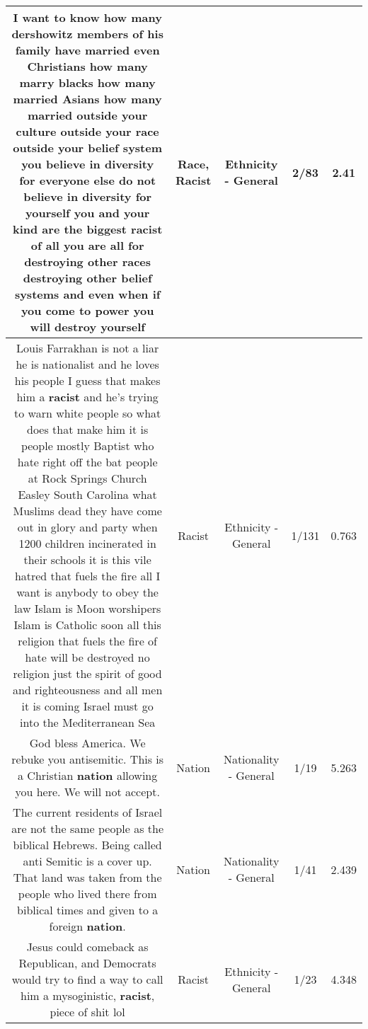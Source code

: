 \documentclass[11pt]{article}
\newlength\mylength
\begin{document}
\begin{center}
\begin{longtable}{|C{.65\mylength}|C{.30\mylength}|C{.12\mylength}|C{.12\mylength}|C{.12\mylength}|}
  \small I want to know how many dershowitz members of his family have married even Christians how many marry blacks how many married Asians how many married outside your culture outside your \textbf{race} outside your belief system you believe in diversity for everyone else do not believe in diversity for yourself you and your kind are the biggest \textbf{racist} of all you are all for destroying other races destroying other belief systems and even when if you come to power you will destroy yourself\normalsize   & Race, Racist & Ethnicity - General & 2/83 & 2.41 \\  \hline
  \small Louis Farrakhan is not a liar he is nationalist and he loves his people I guess that makes him a \textbf{racist} and he's trying to warn white people so what does that make him it is people mostly Baptist who hate right off the bat people at Rock Springs Church Easley South Carolina what Muslims dead they have come out in glory and party when 1200 children incinerated in their schools it is this vile hatred that fuels the fire all I want is anybody to obey the law Islam is Moon worshipers Islam is Catholic soon all this religion that fuels the fire of hate will be destroyed no religion just the spirit of good and righteousness and all men it is coming Israel must go into the Mediterranean Sea\normalsize   & Racist & Ethnicity - General & 1/131 & 0.763 \\  \hline
  \small God bless America. We rebuke you antisemitic. This is a Christian \textbf{nation} allowing you here. We will not accept.\normalsize   & Nation & Nationality - General & 1/19 & 5.263 \\  \hline
  \small The current residents of Israel are not the same people as the biblical Hebrews. Being called anti Semitic is a cover up. That land was taken from the people who lived there from biblical times and given to a foreign \textbf{nation}.\normalsize   & Nation & Nationality - General & 1/41 & 2.439 \\  \hline
  \small Jesus could comeback as Republican, and Democrats would try to find a way to call him a mysoginistic, \textbf{racist}, piece of shit lol\normalsize   & Racist & Ethnicity - General & 1/23 & 4.348 \\  \hline

\end{longtable}
\end{center}
\end{document}
